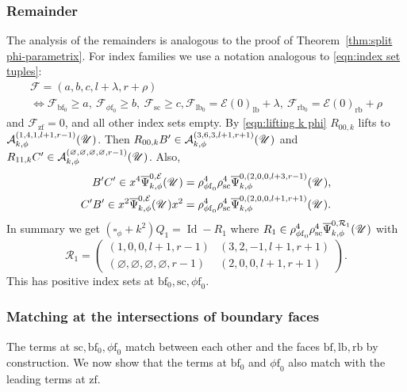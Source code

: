 \documentclass[11pt]{article}
\numberwithin{equation}{section}
\theoremstyle{plain}
\theoremstyle{definition}
\newcommand\calA{{\mathcal A}}
\newcommand\calE{{\mathcal E}}
\newcommand\calF{{\mathcal F}}
\newcommand\calR{{\mathcal R}}
\newcommand{\phif}{{\phi\mathrm{f}}}
\newcommand{\lf}{{\mathrm{lb}}}
\newcommand{\rf}{{\mathrm{rb}}}
\newcommand{\lfz}{{\mathrm{lb}_0}}
\newcommand{\rfz}{{\mathrm{rb}_0}}
\newcommand{\bbf}{{\mathrm{bf}}}
\newcommand{\bbfz}{{\bbf_0}}
\newcommand{\ssc}{{\mathrm{sc}}}
\newcommand{\zf}{{\mathrm{zf}}}
\DeclareMathOperator{\Id}{Id}
\newcommand{\Psibar}{\overline{\Psi}}
\begin{document}
\subsubsection*{Remainder}
The analysis of the remainders is analogous to the proof of Theorem~\ref{thm:split phi-parametrix}. For index families we use a notation analogous to \eqref{eqn:index set tuples}:
\begin{multline}
\label{eqn:index set tuples k phi}
\calF = (a,b,c,l+\lambda,r+\rho)\\
\iff
\calF_{\bbf_0}\geq a,\ \calF_{\phif_0}\geq b,\ \calF_\ssc\geq c,\calF_\lfz=\calE(0)_\lf+\lambda,\ \calF_\rfz=\calE(0)_\rf+\rho
\end{multline}
and $\calF_\zf=0$, and all other index sets empty.
By \eqref{eqn:lifting k phi} $R_{00,k}$ lifts to $\calA_{k,\phi}^{(1,4,1,l+1,r-1)}(\U)$.
Then $R_{00,k}B'\in\calA_{k,\phi}^{(3,6,3,l+1,r+1)}(\U)$ and $R_{11,k}C' \in \calA_{k,\phi}^{(\varnothing,\varnothing,\varnothing,\varnothing,r-1)}(\U)$. Also,
\begin{align*}
B'C'\in x^4\Psibar_{k,\phi}^{0,\calE}(\U)&=
\rho_{\phif_0}^4\rho_\ssc^4 \Psibar_{k,\phi}^{0,(2,0,0,l+3,r-1)}(\U), \\
C'B'\in x^2\Psibar_{k,\phi}^{0,\calE}(\U)x^2 &= \rho_{\phif_0}^4
\rho_\ssc^4\Psibar_{k,\phi}^{0,(2,0,0,l+1,r+1)}(\U).
\end{align*}
In summary we get
$(\square_\phi+k^2)Q_1=\Id - R_1$ where
$R_1\in\rho_{\phif_0}^4\rho_\ssc^4\Psibar_{k,\phi}^{0,\calR_1}(\U)$ with
\begin{equation}
\label{eqn:R1 k phi para}
\calR_1 =
\begin{pmatrix}
(1,0,0,l+1,r-1) & (3,2,-1,l+1,r+1) \\
(\varnothing,\varnothing,\varnothing,\varnothing,r-1) & (2,0,0,l+1,r+1)
\end{pmatrix}.
\end{equation}
This has positive index sets at $\bbf_0,\ssc,\phif_0$.

\subsubsection*{Matching at the intersections of boundary faces}
The terms at $\ssc,\bbfz, \phif_0$ match \hbox{between} each other and the faces $\bbf, \lf, \rf$ by construction.
We now show that the terms at $\bbfz$ and $\phif_0$ also match with the leading terms at $\zf$.
\end{document}
